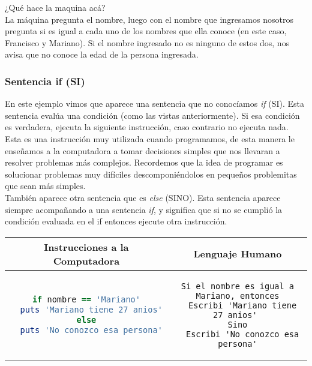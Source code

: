 
¿Qué hace la maquina acá?\\

La máquina pregunta el nombre, luego con el nombre que ingresamos nosotros pregunta si es igual a cada uno de los nombres que ella conoce (en este caso, Francisco y Mariano). Si el nombre ingresado no es ninguno de estos dos, nos avisa que no conoce la edad de la persona ingresada.

\subsubsection{Sentencia if (SI)}
En este ejemplo vimos que aparece una sentencia que no conocíamos \emph{if} (SI). Esta sentencia evalúa una condición (como las vistas anteriormente). Si esa condición es verdadera, ejecuta la siguiente instrucción, caso contrario no ejecuta nada.\\

Esta es una instrucción muy utilizada cuando programamos, de esta manera le enseñamos a la computadora a tomar decisiones simples que nos llevaran a resolver problemas más complejos. Recordemos que la idea de programar es solucionar problemas muy difíciles descomponiéndolos en pequeños problemitas que sean más simples.\\

También aparece otra sentencia que es \emph{else} (SINO). Esta sentencia aparece siempre acompañando a una sentencia \emph{if}, y significa que si no se cumplió la condición evaluada en el if entonces ejecute otra instrucción.

\begin{center}
\begin{tabular}{|c|c|}
\hline
\rowcolor[gray]{0.9}Instrucciones a la Computadora & Lenguaje Humano \\
\hline
\begin{lstlisting}[language=ruby]
if nombre == 'Mariano'
  puts 'Mariano tiene 27 anios'
else
  puts 'No conozco esa persona'
\end{lstlisting} & \begin{lstlisting}
Si el nombre es igual a Mariano, entonces
  Escribi 'Mariano tiene 27 anios' 
Sino
  Escribi 'No conozco esa persona'
\end{lstlisting} \\
\hline
\end{tabular}
\end{center}

